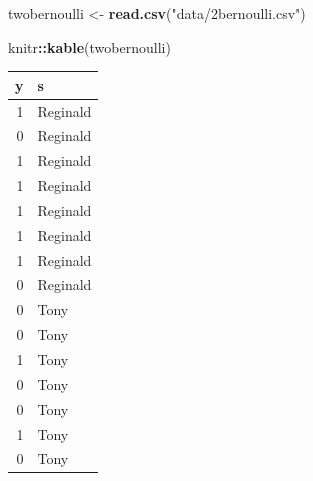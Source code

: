\documentclass[
  12pt,
]{book}
\newenvironment{Shaded}{\begin{snugshade}}{\end{snugshade}}
\newcommand{\DataTypeTok}[1]{\textcolor[rgb]{0.13,0.29,0.53}{#1}}
\newcommand{\DecValTok}[1]{\textcolor[rgb]{0.00,0.00,0.81}{#1}}
\newcommand{\KeywordTok}[1]{\textcolor[rgb]{0.13,0.29,0.53}{\textbf{#1}}}
\newcommand{\NormalTok}[1]{#1}
\newcommand{\OperatorTok}[1]{\textcolor[rgb]{0.81,0.36,0.00}{\textbf{#1}}}
\newcommand{\StringTok}[1]{\textcolor[rgb]{0.31,0.60,0.02}{#1}}
\theoremstyle{definition}
\theoremstyle{definition}
\theoremstyle{definition}
\theoremstyle{remark}
\begin{document}
\begin{Shaded}
\begin{Highlighting}[]
\NormalTok{twobernoulli <-}\StringTok{ }\KeywordTok{read.csv}\NormalTok{(}\StringTok{"data/2bernoulli.csv"}\NormalTok{)}

\NormalTok{knitr}\OperatorTok{::}\KeywordTok{kable}\NormalTok{(twobernoulli)}
\end{Highlighting}
\end{Shaded}

\begin{tabular}{r|l}
\hline
y & s\\
\hline
1 & Reginald\\
\hline
0 & Reginald\\
\hline
1 & Reginald\\
\hline
1 & Reginald\\
\hline
1 & Reginald\\
\hline
1 & Reginald\\
\hline
1 & Reginald\\
\hline
0 & Reginald\\
\hline
0 & Tony\\
\hline
0 & Tony\\
\hline
1 & Tony\\
\hline
0 & Tony\\
\hline
0 & Tony\\
\hline
1 & Tony\\
\hline
0 & Tony\\
\hline
\end{tabular}

\begin{Shaded}
\end{Shaded}
\end{document}
